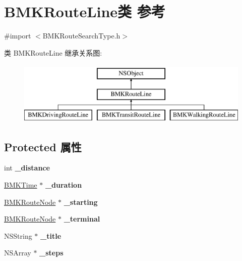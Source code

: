 \hypertarget{interface_b_m_k_route_line}{}\section{B\+M\+K\+Route\+Line类 参考}
\label{interface_b_m_k_route_line}


{\ttfamily \#import $<$B\+M\+K\+Route\+Search\+Type.\+h$>$}

类 B\+M\+K\+Route\+Line 继承关系图\+:\begin{figure}[H]
\begin{center}
\leavevmode
\includegraphics[height=3.000000cm]{interface_b_m_k_route_line}
\end{center}
\end{figure}
\subsection*{Protected 属性}
\begin{DoxyCompactItemize}
\item 
\hypertarget{interface_b_m_k_route_line_ab4bc6b811527065bb19e0c8d1af822ee}{}int {\bfseries \+\_\+distance}\label{interface_b_m_k_route_line_ab4bc6b811527065bb19e0c8d1af822ee}

\item 
\hypertarget{interface_b_m_k_route_line_ab856ba5b78a2bb4d3625c0cf74b1e427}{}\hyperlink{interface_b_m_k_time}{B\+M\+K\+Time} $\ast$ {\bfseries \+\_\+duration}\label{interface_b_m_k_route_line_ab856ba5b78a2bb4d3625c0cf74b1e427}

\item 
\hypertarget{interface_b_m_k_route_line_adbeb7549910a94f1b6513b124808d57f}{}\hyperlink{interface_b_m_k_route_node}{B\+M\+K\+Route\+Node} $\ast$ {\bfseries \+\_\+starting}\label{interface_b_m_k_route_line_adbeb7549910a94f1b6513b124808d57f}

\item 
\hypertarget{interface_b_m_k_route_line_a42ee9b3affc42d0a25c52fa0dc2d4a8f}{}\hyperlink{interface_b_m_k_route_node}{B\+M\+K\+Route\+Node} $\ast$ {\bfseries \+\_\+terminal}\label{interface_b_m_k_route_line_a42ee9b3affc42d0a25c52fa0dc2d4a8f}

\item 
\hypertarget{interface_b_m_k_route_line_a862b967d37cfd210ba72dcaa6bad75b1}{}N\+S\+String $\ast$ {\bfseries \+\_\+title}\label{interface_b_m_k_route_line_a862b967d37cfd210ba72dcaa6bad75b1}

\item 
\hypertarget{interface_b_m_k_route_line_ad573249944bdb333411aa9ea588b3eb0}{}N\+S\+Array $\ast$ {\bfseries \+\_\+steps}\label{interface_b_m_k_route_line_ad573249944bdb333411aa9ea588b3eb0}

\end{DoxyCompactItemize}
